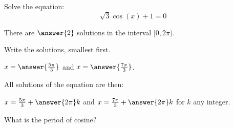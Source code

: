 \documentclass{ximera}
\author{Bobby Ramsey}
\begin{document}
\begin{exercise}

	Solve the equation:
	 \[\sqrt{3} \cos(x) + 1 = 0\]
	
	There are $\answer{2}$ solutions in the interval $[0, 2\pi)$.	
	\begin{exercise}
		Write the solutions, smallest first.
		
		$x = \answer{\frac{5\pi}{3}}$ and $x = \answer{\frac{7\pi}{3}}$.
		\begin{exercise}
			All solutions of the equation are then:
			
			$x = \frac{5 \pi}{3} + \answer{2\pi} k$ and $x=\frac{7\pi}{3} + \answer{2\pi} k$ for $k$ any integer.
			\begin{hint}
				What is the period of cosine?
			\end{hint}
		\end{exercise}

	\end{exercise}

\end{exercise}
\end{document}
